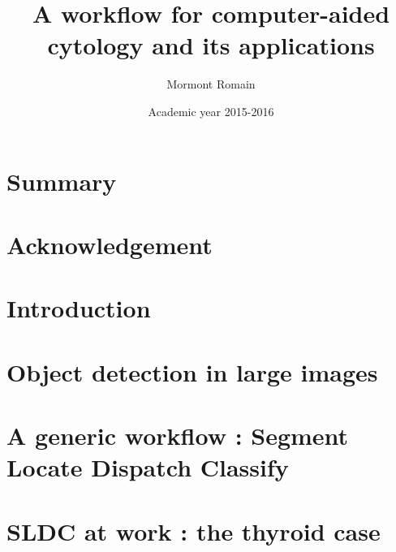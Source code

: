 \documentclass[a4paper,11pt]{report}
\author{Mormont Romain}
\title{A workflow for computer-aided cytology and its applications}
\date{Academic year 2015-2016}
\begin{document}
	
	
	
	\newpage
	
	\tableofcontents
	
	\newpage

	\chapter*{Summary}
	
	\newpage
	
	\chapter*{Acknowledgement}
	
	\newpage
	
	\setcounter{page}{1}
	\chapter{Introduction}
	
	\newpage
	
	\chapter{Object detection in large images}
	
	\newpage
	
	\chapter{A generic workflow : Segment Locate Dispatch Classify}
	
	\newpage
	
	\chapter{SLDC at work : the thyroid case}
	
	\newpage
	
\end{document}
